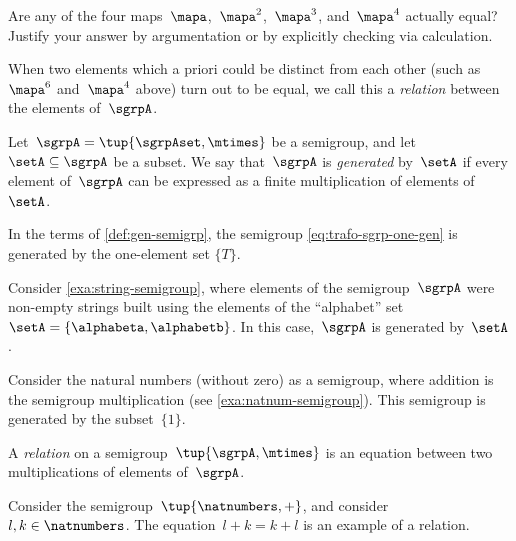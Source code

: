 \begin{gradedexercise}
	\label{ex:CheckRelations}
	Are any of the four maps~$\mapa$,~$\mapa^2$,~$\mapa^3$, and~$\mapa^4$ actually equal?
	Justify your answer by argumentation or by explicitly checking via calculation.
\end{gradedexercise}

When two elements which a priori could be distinct from each other (such as~$\mapa^6$ and~$\mapa^4$ above) turn out to be equal, we call this a \emph{relation} between the elements of~$\sgrpA$.

\begin{ctdefinition}
	\label{def:gen-semigrp}
	Let~$\sgrpA = \tup{\sgrpAset, \mtimes}$ be a semigroup, and let~$\setA \subseteq \sgrpA$ be a subset.
	We say that~$\sgrpA$ is \emph{generated} by~$\setA$ if every element of~$\sgrpA$ can be expressed as a finite multiplication of elements of~$\setA$.
\end{ctdefinition}

\begin{remark}
	In the terms of \cref{def:gen-semigrp}, the semigroup \cref{eq:trafo-sgrp-one-gen} is generated by the one-element set $\{ T \}$.
\end{remark}

\begin{example}
	Consider \cref{exa:string-semigroup}, where elements of the semigroup~$\sgrpA$ were non-empty strings built using the elements of the ``alphabet'' set~$\setA = \{ \alphabeta, \alphabetb\}$.
	In this case,~$\sgrpA$ is generated by~$\setA$.
\end{example}

\begin{example}
	Consider the natural numbers (without zero) as a semigroup, where addition is the semigroup multiplication (see \cref{exa:natnum-semigroup}).
	This semigroup is generated by the subset~$\{1 \}$.
\end{example}

\begin{ctdefinition}
	A \emph{relation} on a semigroup~$\tup{\sgrpA, \mtimes}$ is an equation between two multiplications of elements of~$\sgrpA$.
\end{ctdefinition}

\begin{example}
	Consider the semigroup~$\tup{\natnumbers, +}$, and consider~$l, k \in \natnumbers$.
	The equation~$l + k = k + l$ is an example of a relation.
\end{example}

